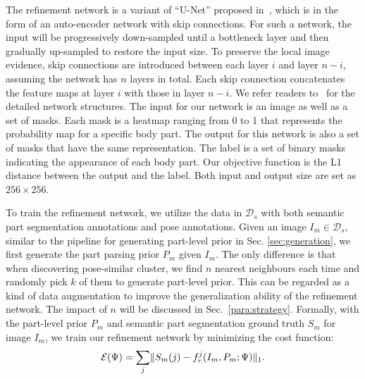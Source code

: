 \documentclass[10pt,twocolumn,letterpaper]{article}
\begin{document}
The refinement network is a variant of ``U-Net'' proposed in~\cite{pix2pix2016}, which is in the form of an auto-encoder network with skip connections. For such a network, the input will be progressively down-sampled until a bottleneck layer and then gradually up-sampled to restore the input size. To preserve the local image evidence, skip connections are introduced between each layer $i$ and layer $n - i$, assuming the network has $n$ layers in total. Each skip connection concatenates the feature maps at layer $i$ with those in layer $n - i$. We refer readers to~\cite{pix2pix2016} for the detailed network structures. The input for our network is an image as well as a set of masks. Each mask is a heatmap ranging from 0 to 1 that represents the probability map for a specific body part. The output for this network is also a set of masks that have the same representation. The label is a set of binary masks indicating the appearance of each body part. Our objective function is the L1 distance between the output and the label. Both input and output size are set as $256\times 256$.

To train the refinement network, we utilize the data in  $\mathcal{D}_{s}$ with both semantic part segmentation annotations and pose annotations. Given an image $I_{m} \in \mathcal{D}_{s}$, similar to the pipeline for generating part-level prior in Sec. \ref{sec:generation}, we first generate the part parsing prior $P_{m}$ given $I_{m}$. The only difference is that when discovering pose-similar cluster, we find $n$ nearest neighbours each time and randomly pick $k$ of them to generate part-level prior. This can be regarded as a kind of data augmentation to improve the generalization ability of the refinement network. The impact of $n$ will be discussed in Sec.~\ref{para:strategy}. Formally, with the part-level prior $P_{m}$ and semantic part segmentation ground truth $S_{m}$ for image $I_{m}$, we train our refinement network by minimizing the cost function:
\begin{equation}
\mathcal{E}(\Psi) = \sum_{j} \lVert S_{m}(j)-f_{r}^{j}(I_{m},P_{m};\Psi) \rVert_{1} .
\vspace{-2mm}
\end{equation}
\end{document}
